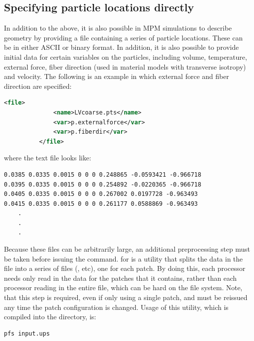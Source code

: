 \subsection{Specifying particle locations directly}
In addition to the above, it is also possible in MPM simulations to describe
geometry by providing a file containing a series of particle locations.  These
can be in either ASCII or binary format.  In addition, it is also possible to
provide initial data for certain variables on the particles, including
volume, temperature, external force, fiber direction (used in material models
with transverse isotropy) and velocity.  The following is an example in which
external force and fiber direction are specified:
\begin{lstlisting}[language=XML]
          <file>
              <name>LVcoarse.pts</name>
              <var>p.externalforce</var>
              <var>p.fiberdir</var>
          </file>
\end{lstlisting}
where the text file  looks like:
\begin{lstlisting}[backgroundcolor=\color{background}]
0.0385 0.0335 0.0015 0 0 0 0.248865 -0.0593421 -0.966718
0.0395 0.0335 0.0015 0 0 0 0.254892 -0.0220365 -0.966718
0.0405 0.0335 0.0015 0 0 0 0.267002 0.0197728 -0.963493
0.0415 0.0335 0.0015 0 0 0 0.261177 0.0588869 -0.963493
	.
	.
	.
\end{lstlisting}
Because these files can be arbitrarily large, an additional preprocessing step
must be taken before issuing the  command.
 for  is a utility that splits the
data in the  file into a series of files
(, etc), one for each
patch.  By doing this, each processor needs only read in the data for the
patches that it contains, rather than each processor reading in the entire file,
which can be hard on the file system.  Note, that this step is required,
even if only using a single patch, and must be reissued any time the patch
configuration is changed.  Usage of this utility, which is compiled
into the  directory, is:
\begin{lstlisting}[backgroundcolor=\color{background}]
   pfs input.ups
\end{lstlisting}

